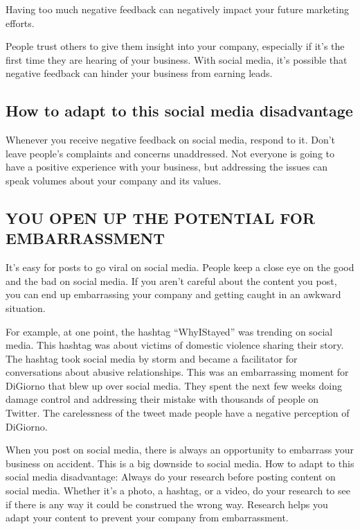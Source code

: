 \documentclass[a4paper]{article}
\begin{document}
Having too much negative feedback can negatively impact your future marketing efforts.

People trust others to give them insight into your company, especially if it’s the first time they are hearing of your business. With social media, it’s possible that negative feedback can hinder your business from earning leads.
  \subsection{How to adapt to this social media disadvantage}
  Whenever you receive negative feedback on social media, respond to it. Don’t leave people’s complaints and concerns unaddressed. Not everyone is going to have a positive experience with your business, but addressing the issues can speak volumes about your company and its values.
  \subsection{YOU OPEN UP THE POTENTIAL FOR EMBARRASSMENT}
  It’s easy for posts to go viral on social media. People keep a close eye on the good and the bad on social media. If you aren’t careful about the content you post, you can end up embarrassing your company and getting caught in an awkward situation.

For example, at one point, the hashtag “WhyIStayed” was trending on social media. This hashtag was about victims of domestic violence sharing their story. The hashtag took social media by storm and became a facilitator for conversations about abusive relationships.
This was an embarrassing moment for DiGiorno that blew up over social media. They spent the next few weeks doing damage control and addressing their mistake with thousands of people on Twitter. The carelessness of the tweet made people have a negative perception of DiGiorno.

When you post on social media, there is always an opportunity to embarrass your business on accident. This is a big downside to social media.
 How to adapt to this social media disadvantage: Always do your research before posting content on social media. Whether it’s a photo, a hashtag, or a video, do your research to see if there is any way it could be construed the wrong way. Research helps you adapt your content to prevent your company from embarrassment.
\end{document}
